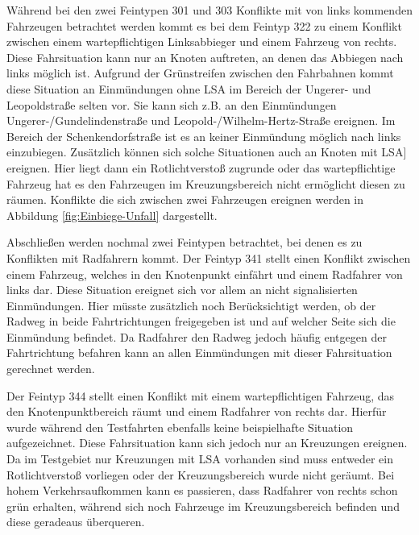 Während bei den zwei Feintypen 301 und 303 Konflikte mit von links kommenden Fahrzeugen betrachtet werden kommt es bei dem Feintyp 322 zu einem Konflikt zwischen einem wartepflichtigen Linksabbieger und einem Fahrzeug von rechts. Diese Fahrsituation kann nur an Knoten auftreten, an denen das Abbiegen nach links möglich ist. Aufgrund der Grünstreifen zwischen den Fahrbahnen kommt diese Situation an Einmündungen ohne LSA im Bereich der Ungerer- und Leopoldstraße selten vor. Sie kann sich z.B. an den Einmündungen Ungerer-/Gundelindenstraße und Leopold-/Wilhelm-Hertz-Straße ereignen. Im Bereich der Schenkendorfstraße ist es an keiner Einmündung möglich nach links einzubiegen. Zusätzlich können sich solche Situationen auch an Knoten mit \ac{LSA}] ereignen. Hier liegt dann ein Rotlichtverstoß zugrunde oder das wartepflichtige Fahrzeug hat es den Fahrzeugen im Kreuzungsbereich nicht ermöglicht diesen zu räumen. Konflikte die sich zwischen zwei Fahrzeugen ereignen werden in Abbildung \ref{fig:Einbiege-Unfall} dargestellt.

Abschließen werden nochmal zwei Feintypen betrachtet, bei denen es zu Konflikten mit Radfahrern kommt. Der Feintyp 341 stellt einen Konflikt zwischen einem Fahrzeug, welches in den Knotenpunkt einfährt und einem Radfahrer von links dar. Diese Situation ereignet sich vor allem an nicht signalisierten Einmündungen. Hier müsste zusätzlich noch Berücksichtigt werden, ob der Radweg in beide Fahrtrichtungen freigegeben ist und auf welcher Seite sich die Einmündung befindet. Da Radfahrer den Radweg jedoch häufig entgegen der Fahrtrichtung befahren kann an allen Einmündungen mit dieser Fahrsituation gerechnet werden.

Der Feintyp 344 stellt einen Konflikt mit einem wartepflichtigen Fahrzeug, das den Knotenpunktbereich räumt und einem Radfahrer von rechts dar. Hierfür wurde während den Testfahrten ebenfalls keine beispielhafte Situation aufgezeichnet. Diese Fahrsituation kann sich jedoch nur an Kreuzungen ereignen. Da im Testgebiet nur Kreuzungen mit LSA vorhanden sind muss entweder ein Rotlichtverstoß vorliegen oder der Kreuzungsbereich wurde nicht geräumt. Bei hohem Verkehrsaufkommen kann es passieren, dass Radfahrer von rechts schon grün erhalten, während sich noch Fahrzeuge im Kreuzungsbereich befinden und diese geradeaus überqueren.

